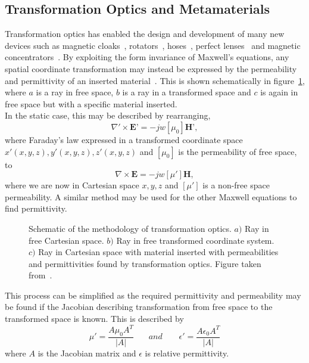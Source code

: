 \documentclass[11pt]{iopart}
\begin{document}
\subsection*{Transformation Optics and Metamaterials}
Transformation optics has enabled the design and development of many
new devices such as magnetic cloaks~\cite{Sun2017}, rotators~\cite{Sun2017}, hoses~\cite{Navau2014}, perfect lenses~\cite{Pendry2000} and
magnetic concentrators~\cite{Navau2012}\cite{N2014}. By exploiting the form invariance of Maxwell's
equations, any spatial coordinate transformation may instead be expressed by
the permeability and permittivity of an inserted material~\cite{Pendry2006}. This is shown schematically in figure~\ref{TO}, where $a$ is a ray in free space, $b$ is a ray in a transformed space and $c$ is again in free space but with a specific material inserted. \\
In the static case, this may be described by rearranging,
\begin{equation}
  \label{ME1}
  \nabla'\times \textbf{E'} = -jw[\mu_0]\textbf{H'},
\end{equation}
where Faraday's law expressed in a
transformed coordinate space $x'(x, y, z), y'(x,
y, z), z'(x, y, z)$ and $[\mu_0]$ is the permeability of free space,
to
\begin{equation}
  \label{ME2}
  \nabla\times \textbf{E} = -jw[\mu']\textbf{H},
\end{equation}
where we are now in Cartesian space $x,y,z$
and $[\mu']$ is a non-free space permeability. A similar method may be used for the other Maxwell equations to find permittivity.\\
\begin{figure}[!t] \centering
  \caption{\label{TO} Schematic of the methodology of transformation optics. $a)$ Ray in free Cartesian space. $b)$ Ray in free transformed coordinate system. $c)$ Ray in Cartesian space with material inserted with permeabilities and permittivities found by transformation optics. Figure taken from~\cite{Thesis}.}
  \end{figure}

\noindent This process can be simplified as the required permittivity and permeability may
be found if the Jacobian describing transformation from free space to the transformed space is known. This is described by
\begin{equation}
  \label{J}
  \mu'=\frac{A\mu_0 A^T}{|A|}~~~~~~~~and~~~~~~~~~\epsilon'=\frac{A\epsilon_0 A^T}{|A|}
\end{equation}
where $A$ is the Jacobian matrix and $\epsilon$ is relative permittivity. \\
\end{document}
